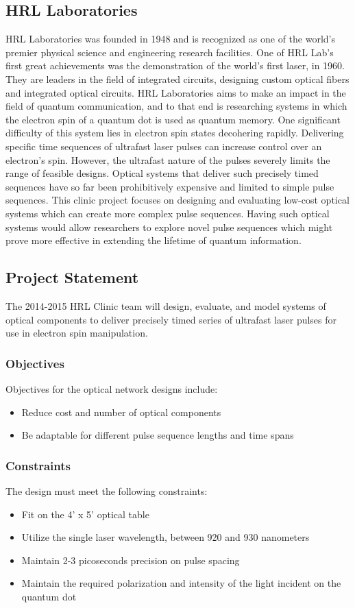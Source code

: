 \documentclass[pdftex,12pt,a4paper]{article}
\begin{document}
\subsection{HRL Laboratories}
HRL Laboratories was founded in 1948 and is recognized as one of the world’s premier physical science and engineering research facilities. One of HRL Lab’s first great achievements was the demonstration of the world’s first laser, in 1960. They are leaders in the field of integrated circuits, designing custom optical fibers and integrated optical circuits. 
HRL Laboratories aims to make an impact in the field of quantum communication, and to that end is researching systems in which the electron spin of a quantum dot is used as quantum memory. One significant difficulty of this system lies in electron spin states decohering rapidly. Delivering specific time sequences of ultrafast laser pulses can increase control over an electron’s spin. However, the ultrafast nature of the pulses severely limits the range of feasible designs. Optical systems that deliver such precisely timed sequences have so far been prohibitively expensive and limited to simple pulse sequences. This clinic project focuses on designing and evaluating low-cost optical systems which can create more complex pulse sequences. Having such optical systems would allow researchers to explore novel pulse sequences which might prove more effective in extending the lifetime of quantum information.

\subsection{Project Statement}
The 2014-2015 HRL Clinic team will design, evaluate, and model systems of optical components to deliver precisely timed series of ultrafast laser pulses for use in electron spin manipulation.

\subsubsection{Objectives}
Objectives for the optical network designs include:
\begin{itemize}
\item Reduce cost and number of optical components
\item Be adaptable for different pulse sequence lengths and time spans
\end{itemize}

\subsubsection{Constraints}
The design must meet the following constraints:
\begin{itemize}
\item Fit on the 4’ x 5’ optical table
\item Utilize the single laser wavelength, between 920 and 930 nanometers
\item Maintain 2-3 picoseconds precision on pulse spacing
\item Maintain the required polarization and intensity of the light incident on the quantum dot
\end{itemize}
\end{document}
